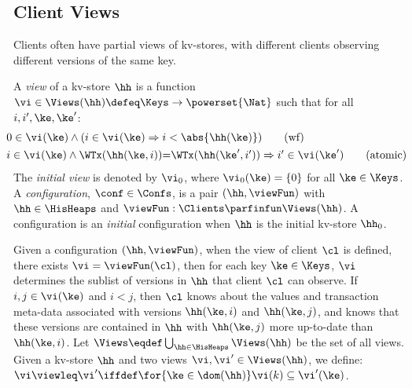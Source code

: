



\subsection{Client Views}

Clients often have partial views of kv-stores, 
with different clients observing 
different versions of the same key.

\begin{definition}[Views]
\label{def:view}
\label{def:cuts}
\label{def:views}
\label{def:configuration}
A \emph{view} of a kv-store $\hh$ is a function
$\vi \in \Views(\hh) \defeq \Keys \to\powerset{\Nat}$ such that for all $i, i', \ke, \ke'$:
\begin{align}
    & \hspace*{-8pt}
    0 \in \vi(\ke) 
    \wedge (i \in \vi(\ke) \Rightarrow i < \abs{ \hh(\ke) }) 
    \tag{wf}
    \label{eq:view.wf}\\
    & \hspace*{-8pt}
    \begin{array}{@{}l@{}}
	i \in \vi(\ke)  
  	\land \WTx(\hh(\ke, i)) {=} \WTx(\hh(\ke', i'))  
  	\Rightarrow i' \in \vi(\ke')
    \end{array}
	\tag{atomic}
	\label{eq:view.atomic}
\end{align}
The \emph{initial view} is denoted by $\vi_{0}$, where $\vi_{0}(\ke) = \{0\}$ for all $\ke \in \Keys$. 
A \emph{configuration}, $\conf \in \Confs$,  is a pair $ (\hh, \viewFun)$
with $\hh \in \HisHeaps$ and
$\viewFun : \Clients \parfinfun \Views(\hh)$. A configuration is an 
\emph{initial} configuration when $\hh$ is the initial kv-store
$\hh_{0}$. 
\end{definition}
%


Given a configuration $(\hh, \viewFun)$, when the view of client 
$\cl$ is defined, \ie there exists $\vi = \viewFun(\cl)$, then for each key $\ke \in \Keys$, 
$\vi$ determines the sublist of versions in $\hh$ that client $\cl$ can observe. 
If $i,j \in \vi(\ke)$ and $i < j$, then $\cl$ knows about the values and 
transaction meta-data associated with versions $\hh(\ke, i)$ and  $\hh(\ke, j)$, 
and  knows that these versions are contained in $\hh$ with  $\hh(\ke, j)$ more 
up-to-date than $\hh(\ke, i)$. 
Let $\Views \eqdef \bigcup_{\hh \in \HisHeaps} \Views(\hh)$ be the set of all views. 
Given a kv-store $\hh$ and two views $\vi, \vi' \in \Views(\hh)$, 
we define: $\vi \viewleq \vi' \iffdef \for{\ke \in \dom(\hh)} \vi(k) \subseteq \vi'(\ke)$.

